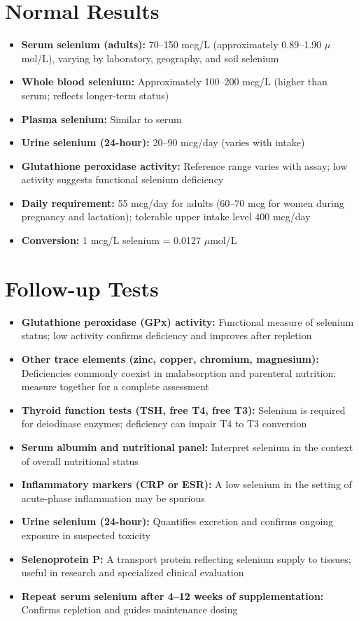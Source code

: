 \section*{Normal Results}
\begin{itemize}
  \item \textbf{Serum selenium (adults):} 70--150 mcg/L (approximately 0.89--1.90 $\mu$mol/L), varying by laboratory, geography, and soil selenium
  \item \textbf{Whole blood selenium:} Approximately 100--200 mcg/L (higher than serum; reflects longer-term status)
  \item \textbf{Plasma selenium:} Similar to serum
  \item \textbf{Urine selenium (24-hour):} 20--90 mcg/day (varies with intake)
  \item \textbf{Glutathione peroxidase activity:} Reference range varies with assay; low activity suggests functional selenium deficiency
  \item \textbf{Daily requirement:} 55 mcg/day for adults (60--70 mcg for women during pregnancy and lactation); tolerable upper intake level 400 mcg/day
  \item \textbf{Conversion:} 1 mcg/L selenium = 0.0127 $\mu$mol/L
\end{itemize}

\section*{Follow-up Tests}
\begin{itemize}
  \item \textbf{Glutathione peroxidase (GPx) activity:} Functional measure of selenium status; low activity confirms deficiency and improves after repletion
  \item \textbf{Other trace elements (zinc, copper, chromium, magnesium):} Deficiencies commonly coexist in malabsorption and parenteral nutrition; measure together for a complete assessment
  \item \textbf{Thyroid function tests (TSH, free T4, free T3):} Selenium is required for deiodinase enzymes; deficiency can impair T4 to T3 conversion
  \item \textbf{Serum albumin and nutritional panel:} Interpret selenium in the context of overall nutritional status
  \item \textbf{Inflammatory markers (CRP or ESR):} A low selenium in the setting of acute-phase inflammation may be spurious
  \item \textbf{Urine selenium (24-hour):} Quantifies excretion and confirms ongoing exposure in suspected toxicity
  \item \textbf{Selenoprotein P:} A transport protein reflecting selenium supply to tissues; useful in research and specialized clinical evaluation
  \item \textbf{Repeat serum selenium after 4--12 weeks of supplementation:} Confirms repletion and guides maintenance dosing
\end{itemize}

